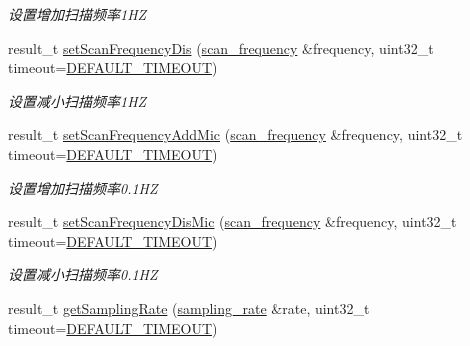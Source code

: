 \begin{DoxyCompactItemize}
\begin{DoxyCompactList}\small\item\em 设置增加扫描频率1\+HZ ~\newline
\end{DoxyCompactList}\item 
result\+\_\+t \hyperlink{classydlidar_1_1_y_dlidar_driver_a811e3e1f0012925c8a90aebda9716738}{set\+Scan\+Frequency\+Dis} (\hyperlink{structscan__frequency}{scan\+\_\+frequency} \&frequency, uint32\+\_\+t timeout=\hyperlink{classydlidar_1_1_y_dlidar_driver_a13a4f2dc4067b43794b2c47c06d5d27aa07c79ce96f468ff4b40495ef84584442}{D\+E\+F\+A\+U\+L\+T\+\_\+\+T\+I\+M\+E\+O\+UT})
\begin{DoxyCompactList}\small\item\em 设置减小扫描频率1\+HZ ~\newline
\end{DoxyCompactList}\item 
result\+\_\+t \hyperlink{classydlidar_1_1_y_dlidar_driver_aa801f64f5ca2ce1e70ee096eb0b4b612}{set\+Scan\+Frequency\+Add\+Mic} (\hyperlink{structscan__frequency}{scan\+\_\+frequency} \&frequency, uint32\+\_\+t timeout=\hyperlink{classydlidar_1_1_y_dlidar_driver_a13a4f2dc4067b43794b2c47c06d5d27aa07c79ce96f468ff4b40495ef84584442}{D\+E\+F\+A\+U\+L\+T\+\_\+\+T\+I\+M\+E\+O\+UT})
\begin{DoxyCompactList}\small\item\em 设置增加扫描频率0.1\+HZ ~\newline
\end{DoxyCompactList}\item 
result\+\_\+t \hyperlink{classydlidar_1_1_y_dlidar_driver_a00e69cf360eeca890dbaf964ab6f67b7}{set\+Scan\+Frequency\+Dis\+Mic} (\hyperlink{structscan__frequency}{scan\+\_\+frequency} \&frequency, uint32\+\_\+t timeout=\hyperlink{classydlidar_1_1_y_dlidar_driver_a13a4f2dc4067b43794b2c47c06d5d27aa07c79ce96f468ff4b40495ef84584442}{D\+E\+F\+A\+U\+L\+T\+\_\+\+T\+I\+M\+E\+O\+UT})
\begin{DoxyCompactList}\small\item\em 设置减小扫描频率0.1\+HZ ~\newline
\end{DoxyCompactList}\item 
result\+\_\+t \hyperlink{classydlidar_1_1_y_dlidar_driver_a7b7812329013f119235abf74da397aaa}{get\+Sampling\+Rate} (\hyperlink{structsampling__rate}{sampling\+\_\+rate} \&rate, uint32\+\_\+t timeout=\hyperlink{classydlidar_1_1_y_dlidar_driver_a13a4f2dc4067b43794b2c47c06d5d27aa07c79ce96f468ff4b40495ef84584442}{D\+E\+F\+A\+U\+L\+T\+\_\+\+T\+I\+M\+E\+O\+UT})

\end{DoxyCompactItemize}
